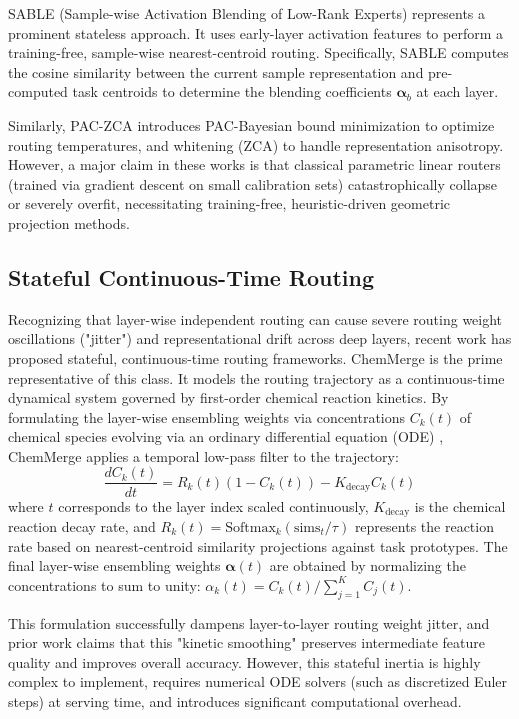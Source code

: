 SABLE (Sample-wise Activation Blending of Low-Rank Experts) \citep{liang23sable} represents a prominent stateless approach. It uses early-layer activation features to perform a training-free, sample-wise nearest-centroid routing. Specifically, SABLE computes the cosine similarity between the current sample representation and pre-computed task centroids to determine the blending coefficients $\boldsymbol{\alpha}_b$ at each layer. 

Similarly, PAC-ZCA \citep{zhang24spszca} introduces PAC-Bayesian bound minimization to optimize routing temperatures, and whitening (ZCA) to handle representation anisotropy. However, a major claim in these works is that classical parametric linear routers (trained via gradient descent on small calibration sets) catastrophically collapse or severely overfit, necessitating training-free, heuristic-driven geometric projection methods.

\subsection{Stateful Continuous-Time Routing}
Recognizing that layer-wise independent routing can cause severe routing weight oscillations ("jitter") and representational drift across deep layers, recent work has proposed stateful, continuous-time routing frameworks. ChemMerge \citep{chemmerge25} is the prime representative of this class. It models the routing trajectory as a continuous-time dynamical system governed by first-order chemical reaction kinetics. By formulating the layer-wise ensembling weights via concentrations $C_k(t)$ of chemical species evolving via an ordinary differential equation (ODE) \citep{chen2018neuralode}, ChemMerge applies a temporal low-pass filter to the trajectory:
\begin{equation}
    \label{eq:chem_kinetics}
    \frac{dC_k(t)}{dt} = R_k(t) (1 - C_k(t)) - K_{\text{decay}} C_k(t)
\end{equation}
where $t$ corresponds to the layer index scaled continuously, $K_{\text{decay}}$ is the chemical reaction decay rate, and $R_k(t) = \text{Softmax}_k(\text{sims}_t / \tau)$ represents the reaction rate based on nearest-centroid similarity projections against task prototypes. The final layer-wise ensembling weights $\boldsymbol{\alpha}(t)$ are obtained by normalizing the concentrations to sum to unity: $\alpha_k(t) = C_k(t) / \sum_{j=1}^K C_j(t)$. 

This formulation successfully dampens layer-to-layer routing weight jitter, and prior work claims that this "kinetic smoothing" preserves intermediate feature quality and improves overall accuracy. However, this stateful inertia is highly complex to implement, requires numerical ODE solvers (such as discretized Euler steps) at serving time, and introduces significant computational overhead.

